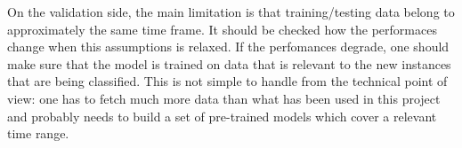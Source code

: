 \documentclass[a4paper,12pt]{article} %
\begin{document}
On the validation side, the main limitation is that training/testing data belong to approximately the same time frame.
It should be checked how the performaces change when this assumptions is relaxed.
If the perfomances degrade, one should make sure that the model is trained on data that is relevant to
the new instances that are being classified.
This is not simple to handle from the technical point of view:
one has to fetch much more data than what has been used in this project and
probably needs to build a set of pre-trained models which cover a relevant time range.


\nocite{*}

%
\renewcommand{\refname}{References}

\end{document}
